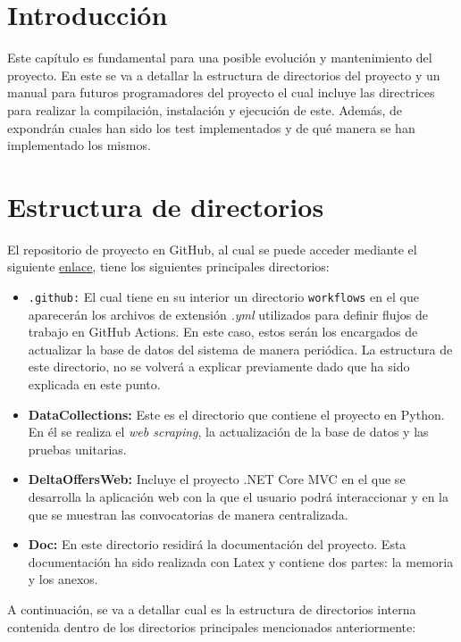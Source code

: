 
\section{Introducción}
Este capítulo es fundamental para una posible evolución y mantenimiento del proyecto. En este se va a detallar la estructura de directorios del proyecto y un manual para futuros programadores del proyecto el cual incluye las directrices para realizar la compilación, instalación y ejecución de este. Además, de expondrán cuales han sido los test implementados y de qué manera se han implementado los mismos.
\section{Estructura de directorios}
El repositorio de proyecto en GitHub, al cual se puede acceder mediante el siguiente \href{https://github.com/miguelUbierna/DeltaOffers}{enlace}, tiene los siguientes principales directorios:

\begin{itemize}
    \item \texttt{.github:} El cual tiene en su interior un directorio \texttt{workflows} en el que aparecerán los archivos de extensión \textit{.yml} utilizados para definir flujos de trabajo en GitHub Actions. En este caso, estos serán los encargados de actualizar la base de datos del sistema de manera periódica. La estructura de este directorio, no se volverá a explicar previamente dado que ha sido explicada en este punto.
    \item \textbf{DataCollections:} Este es el directorio que contiene el proyecto en Python. En él se realiza el \textit{web scraping}, la actualización de la base de datos y las pruebas unitarias.
    \item \textbf{DeltaOffersWeb:} Incluye el proyecto .NET Core MVC en el que se desarrolla la aplicación web con la que el usuario podrá interaccionar y en la que se muestran las convocatorias de manera centralizada.
    \item \textbf{Doc:} En este directorio residirá la documentación del proyecto. Esta documentación ha sido realizada con Latex y contiene dos partes: la memoria y los anexos.
\end{itemize}
A continuación, se va a detallar cual es la estructura de directorios interna contenida dentro de los directorios principales mencionados anteriormente:

